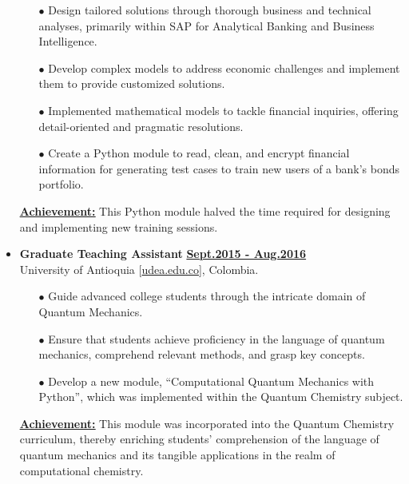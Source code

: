 \begin{itemize}[leftmargin=5mm]
          \begin{itemize}[leftmargin=0mm]
              \small

              \item[$\bullet$] Design tailored solutions through thorough business and technical analyses, primarily within SAP for Analytical Banking and Business Intelligence.
              \item[$\bullet$] Develop complex models to address economic challenges and implement them to provide customized solutions.
              \item[$\bullet$] Implemented mathematical models to tackle financial inquiries, offering detail-oriented and pragmatic resolutions.
              \item[$\bullet$] Create a Python module to read, clean, and encrypt financial information for generating test cases to train new users of a bank's bonds portfolio.
          \end{itemize}

          \textbf{\href{.}{\underline{Achievement:}}}
          This Python module halved the time required for designing and implementing new training sessions.

    \item \textbf{\large Graduate Teaching Assistant}\hfill
          \href{.}{\bf Sept.2015 - Aug.2016}\\
          University of Antioquia [\href{www.udea.edu.co}{udea.edu.co}],
          Colombia.

          \begin{itemize}[leftmargin=0mm]
              \small

              \item[$\bullet$] Guide advanced college students through the intricate domain of Quantum Mechanics.
              \item[$\bullet$] Ensure that students achieve proficiency in the language of quantum mechanics, comprehend relevant methods, and grasp key concepts.
              \item[$\bullet$] Develop a new module, ``Computational Quantum Mechanics with Python'', which was implemented within the Quantum Chemistry subject.
          \end{itemize}

          \textbf{\href{.}{\underline{Achievement:}}}
          This module was incorporated into the Quantum Chemistry curriculum, thereby enriching students' comprehension of the language of quantum mechanics and its tangible applications in the realm of computational chemistry.

\end{itemize}
